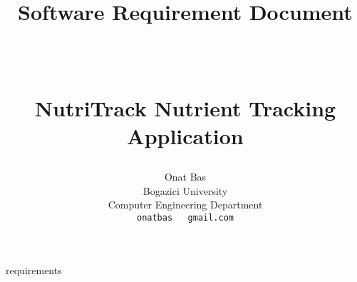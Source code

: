 \documentclass[paper=a4, fontsize=11pt]{article}%
\title{
	\huge \strut Software Requirement Document \strut \\
	\Large \bfseries \strut NutriTrack Nutrient Tracking Application \strut
}
\author{ 									\usefont{OT1}{bch}{m}{n}
        Onat Bas\\
        Bogazici University\\
        Computer Engineering Department\\
        \texttt{onatbas ~ gmail.com}
}
\begin{document}
\maketitle

\newpage
\tableofcontents
\newpage



\newpage
 {requirements}
\end{document}
